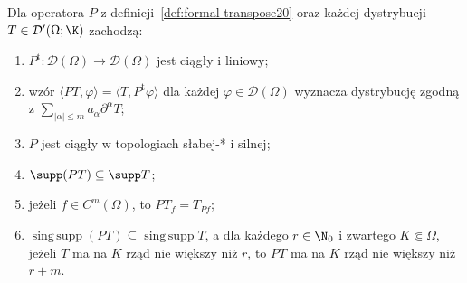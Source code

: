 \begin{twierdzenie}
\label{thm:transpose20}
Dla operatora $P$ z definicji~\ref{def:formal-transpose20}
oraz każdej dystrybucji $T\in\mathcal D'(\Omega;\K)$
zachodzą:
\begin{enumerate}
\item $P^{\mathrm t}:\mathcal D(\Omega)\to\mathcal D(\Omega)$
jest ciągły i liniowy;
\item wzór $\langle PT,\varphi\rangle=
\langle T,P^{\mathrm t}\varphi\rangle$ dla każdej
$\varphi\in\mathcal D(\Omega)$ wyznacza dystrybucję
zgodną z $\sum_{|\alpha|\le m}a_\alpha\partial^\alpha T$;
\item $P$ jest ciągły w topologiach słabej-* i silnej;
\item $\supp(PT)\subseteq\supp T$;
\item jeżeli $f\in C^m(\Omega)$, to $PT_f=T_{Pf}$;
\item $\operatorname{sing\,supp}(PT)\subseteq
\operatorname{sing\,supp}T$, a dla każdego $r\in\N_0$
i zwartego $K\Subset\Omega$, jeżeli $T$ ma na $K$
rząd nie większy niż $r$, to $PT$ ma na $K$ rząd
nie większy niż $r+m$.
\end{enumerate}
\end{twierdzenie}
